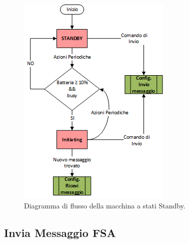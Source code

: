 \begin{figure}[h]
	\centering
	\includegraphics[]{Images/diagrammi_fsa/Standby_fsa}
	\caption[Standby fsa]{Diagramma di flusso della macchina a stati Standby.}
	\label{fig:Standby_fsa}
\end{figure}
\newpage

\subsection{Invia Messaggio FSA}
\label{apx:invio_fsa}

